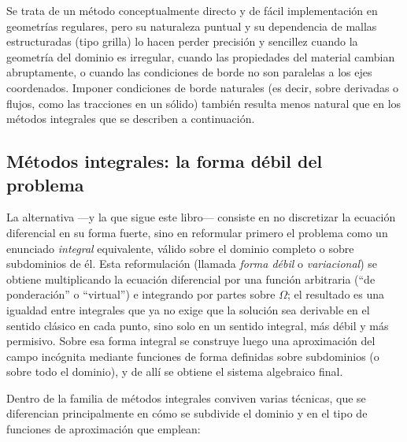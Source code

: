 Se trata de un método conceptualmente directo y de fácil implementación en geometrías regulares, pero su naturaleza puntual y su dependencia de mallas estructuradas (tipo grilla) lo hacen perder precisión y sencillez cuando la geometría del dominio es irregular, cuando las propiedades del material cambian abruptamente, o cuando las condiciones de borde no son paralelas a los ejes coordenados. Imponer condiciones de borde naturales (es decir, sobre derivadas o flujos, como las tracciones en un sólido) también resulta menos natural que en los métodos integrales que se describen a continuación.

\subsection{Métodos integrales: la forma débil del problema}
\label{sec:cap01-metodos-integrales}

La alternativa —y la que sigue este libro— consiste en no discretizar la ecuación diferencial en su forma fuerte, sino en reformular primero el problema como un enunciado \emph{integral} equivalente, válido sobre el dominio completo o sobre subdominios de él. Esta reformulación (llamada \emph{forma débil} o \emph{variacional}) se obtiene multiplicando la ecuación diferencial por una función arbitraria (``de ponderación'' o ``virtual'') e integrando por partes sobre $\Omega$; el resultado es una igualdad entre integrales que ya no exige que la solución sea derivable en el sentido clásico en cada punto, sino solo en un sentido integral, más débil y más permisivo. Sobre esa forma integral se construye luego una aproximación del campo incógnita mediante funciones de forma definidas sobre subdominios (o sobre todo el dominio), y de allí se obtiene el sistema algebraico final.

Dentro de la familia de métodos integrales conviven varias técnicas, que se diferencian principalmente en cómo se subdivide el dominio y en el tipo de funciones de aproximación que emplean:

